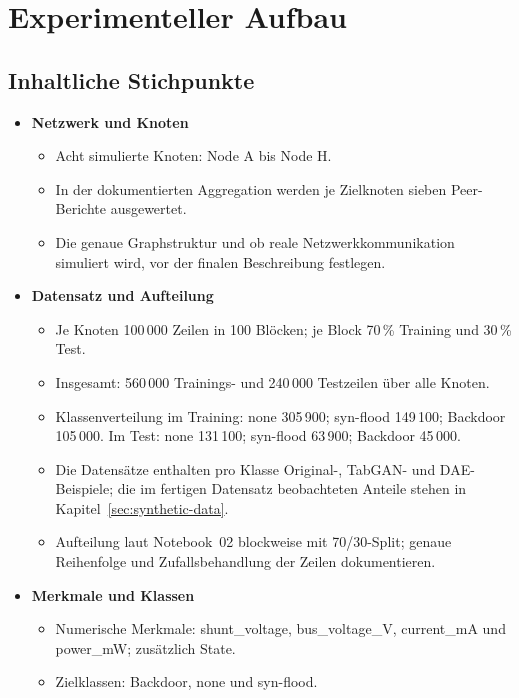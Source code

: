 \section{Experimenteller Aufbau}
\label{sec:experimental-setup}

\subsection{Inhaltliche Stichpunkte}
\begin{itemize}
  \item \textbf{Netzwerk und Knoten}
  \begin{itemize}
    \item Acht simulierte Knoten: Node A bis Node H.
    \item In der dokumentierten Aggregation werden je Zielknoten sieben
          Peer-Berichte ausgewertet.
    \item Die genaue Graphstruktur und ob reale Netzwerkkommunikation
          simuliert wird, vor der finalen Beschreibung festlegen.
  \end{itemize}
  \item \textbf{Datensatz und Aufteilung}
  \begin{itemize}
    \item Je Knoten 100\,000 Zeilen in 100 Blöcken; je Block 70\,\% Training
          und 30\,\% Test.
    \item Insgesamt: 560\,000 Trainings- und 240\,000 Testzeilen über alle
          Knoten.
    \item Klassenverteilung im Training: none 305\,900; syn-flood 149\,100;
          Backdoor 105\,000. Im Test: none 131\,100; syn-flood 63\,900;
          Backdoor 45\,000.
    \item Die Datensätze enthalten pro Klasse Original-, TabGAN- und
          DAE-Beispiele; die im fertigen Datensatz beobachteten Anteile
          stehen in Kapitel~\ref{sec:synthetic-data}.
    \item Aufteilung laut Notebook~02 blockweise mit 70/30-Split;
          genaue Reihenfolge und Zufallsbehandlung der Zeilen dokumentieren.
  \end{itemize}
  \item \textbf{Merkmale und Klassen}
  \begin{itemize}
    \item Numerische Merkmale: shunt\_voltage, bus\_voltage\_V,
          current\_mA und power\_mW; zusätzlich State.
    \item Zielklassen: Backdoor, none und syn-flood.

\end{itemize}
\end{itemize}

